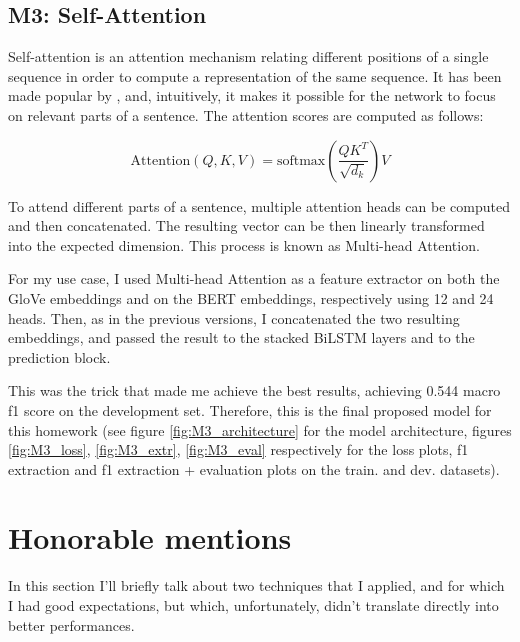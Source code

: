 \documentclass[11pt,a4paper]{article}
\begin{document}
	\subsection{M3: Self-Attention}
	Self-attention is an attention mechanism relating different positions
	of a single sequence in order to compute a representation of the same sequence.
	It has been made popular by \citep{vaswani2017attention}, and, intuitively, it
	makes it possible for the network to focus on relevant parts of a sentence. The
	attention scores are computed as follows:
	
	\begin{equation}
	\mathrm{Attention}(Q, K, V) = \mathrm{softmax}(\frac{QK^T}{\sqrt{d_k}})V
	\end{equation}
	
	To attend different parts of a sentence, multiple attention heads can be
	computed and then concatenated. The resulting vector can be then linearly
	transformed into the expected dimension. This process is known as Multi-head
	Attention.
	
	For my use case, I used Multi-head Attention as a feature extractor on both the
	GloVe embeddings and on the BERT embeddings, respectively using 12 and 24 heads.
	Then, as in the previous versions, I concatenated the two resulting embeddings,
	and passed the result to the stacked BiLSTM layers and to the prediction block.
	
	This was the trick that made me achieve the best results, achieving 0.544 macro
	f1 score on the development set. Therefore, this is the final proposed model for
	this homework (see figure \ref{fig:M3_architecture} for the model architecture,
	figures \ref{fig:M3_loss}, \ref{fig:M3_extr}, \ref{fig:M3_eval} respectively for
	the loss plots, f1 extraction and f1 extraction + evaluation plots on the train.
	and dev. datasets).
	
	\section{Honorable mentions}
	In this section I'll briefly talk about two techniques that I applied, and for
	which I had good expectations, but which, unfortunately, didn't translate
	directly into better performances.
	
\end{document}
